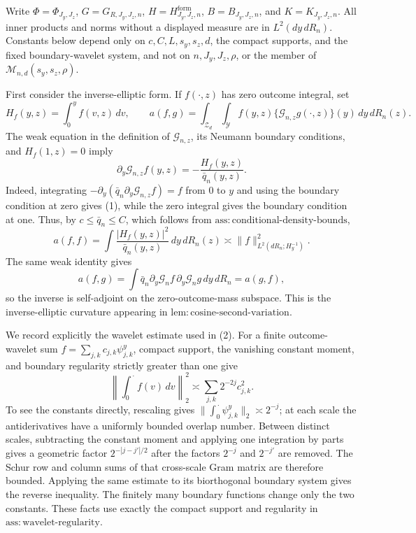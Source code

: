 Write \(\Phi=\Phi_{J_y,J_z}\), \(G=G_{R,J_y,J_z,n}\), \(H=H^{\mathrm{form}}_{J_y,J_z,n}\), \(B=B_{J_y,J_z,n}\), and \(K=K_{J_y,J_z,n}\).  All inner products and norms without a displayed measure are in \(L^2(dy\,dR_n)\).  Constants below depend only on \(c,C,L,s_y,s_z,d\), the compact supports, and the fixed boundary-wavelet system, and not on \(n,J_y,J_z,\rho\), or the member of \(\mathcal M_{n,d}(s_y,s_z,\rho)\).

First consider the inverse-elliptic form.  If \(f(\cdot,z)\) has zero outcome integral, set
\[
 H_f(y,z)=\int_0^y f(v,z)\,dv,
 \qquad
 a(f,g)=\int_{\mathcal Z_d}\int_{\mathcal Y}
 f(y,z)\{\mathcal G_{n,z}g(\cdot,z)\}(y)\,dy\,dR_n(z).
\]
The weak equation in the definition of \(\mathcal G_{n,z}\), its Neumann boundary conditions, and \(H_f(1,z)=0\) imply
\[
 \partial_y\mathcal G_{n,z}f(y,z)=-\frac{H_f(y,z)}{\bar q_n(y,z)}. \tag{1}
\]
Indeed, integrating \(-\partial_y(\bar q_n\partial_y\mathcal G_{n,z}f)=f\) from \(0\) to \(y\) and using the boundary condition at zero gives (1), while the zero integral gives the boundary condition at one.  Thus, by \(c\leq\bar q_n\leq C\), which follows from \(\mathrm{ass{:}conditional\text{-}density\text{-}bounds}\),
\[
 a(f,f)=\int\frac{|H_f(y,z)|^2}{\bar q_n(y,z)}\,dy\,dR_n(z)
 \asymp \|f\|_{L^2(dR_n;H_y^{-1})}^2. \tag{2}
\]
The same weak identity gives
\[
 a(f,g)=\int \bar q_n
 \partial_y\mathcal G_nf\,\partial_y\mathcal G_ng\,dy\,dR_n=a(g,f), \tag{3}
\]
so the inverse is self-adjoint on the zero-outcome-mass subspace.  This is the inverse-elliptic curvature appearing in \(\mathrm{lem{:}cosine\text{-}second\text{-}variation}\).

We record explicitly the wavelet estimate used in (2).  For a finite outcome-wavelet sum \(f=\sum_{j,k}c_{j,k}\psi^y_{j,k}\), compact support, the vanishing constant moment, and boundary regularity strictly greater than one give
\[
 \left\|\int_0^{\,\cdot}f(v)\,dv\right\|_2^2
 \asymp\sum_{j,k}2^{-2j}c_{j,k}^2. \tag{4}
\]
To see the constants directly, rescaling gives \(\|\int_0^{\,\cdot}\psi^y_{j,k}\|_2\asymp2^{-j}\); at each scale the antiderivatives have a uniformly bounded overlap number.  Between distinct scales, subtracting the constant moment and applying one integration by parts gives a geometric factor \(2^{-|j-j'|/2}\) after the factors \(2^{-j}\) and \(2^{-j'}\) are removed.  The Schur row and column sums of that cross-scale Gram matrix are therefore bounded.  Applying the same estimate to its biorthogonal boundary system gives the reverse inequality.  The finitely many boundary functions change only the two constants.  These facts use exactly the compact support and regularity in \(\mathrm{ass{:}wavelet\text{-}regularity}\).

